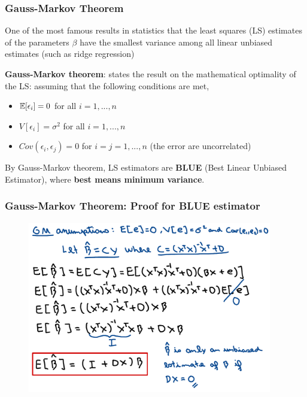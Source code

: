 \begin{frame}
    \frametitle{Gauss-Markov Theorem}

    One of the most famous results in statistics that the least squares (LS)
    estimates of the parameters $\beta$ have the smallest variance among
    all linear unbiased estimates (such as ridge regression)


    \begin{definition}
    \textbf{Gauss-Markov theorem}: states the result on the mathematical
    optimality of the LS: assuming that the following conditions are met,
    \begin{itemize}
        \item $\operatorname*{\mathbb{E}}[\epsilon_i]=0$ for all $i = 1,...,n$
        \item $V[\epsilon_i]=\sigma^2$ for all $i = 1,...,n$
        \item $Cov(\epsilon_i,\epsilon_j) = 0$ for $i=j = 1,...,n$ (the error are uncorrelated)
    \end{itemize}


    By Gauss-Markov theorem, LS estimators are \textbf{BLUE} (Best Linear Unbiased
    Estimator), where \textbf{best means minimum variance}.
        
    \end{definition}
\end{frame}



\begin{frame}
    \frametitle{Gauss-Markov Theorem: Proof for BLUE estimator}
    \begin{figure}
        \centering
        \includegraphics[width=0.95\textwidth]{sections/least_squares_estimation/figures/gm_proof_mean.pdf}
    \end{figure}
\end{frame}



